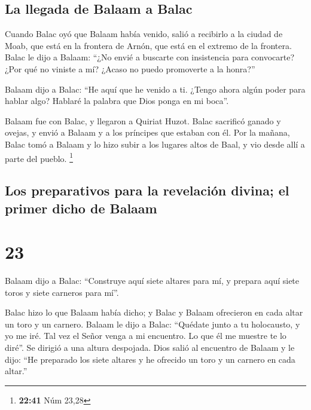 \hypertarget{la-llegada-de-balaam-a-balac}{%
\subsection{La llegada de Balaam a
Balac}\label{la-llegada-de-balaam-a-balac}}

 Cuando Balac oyó que Balaam había venido, salió a
recibirlo a la ciudad de Moab, que está en la frontera de Arnón, que
está en el extremo de la frontera.  Balac le dijo a
Balaam: ``¿No envié a buscarte con insistencia para convocarte? ¿Por qué
no viniste a mí? ¿Acaso no puedo promoverte a la honra?''

 Balaam dijo a Balac: ``He aquí que he venido a ti.
¿Tengo ahora algún poder para hablar algo? Hablaré la palabra que Dios
ponga en mi boca''.

 Balaam fue con Balac, y llegaron a Quiriat Huzot.
 Balac sacrificó ganado y ovejas, y envió a Balaam y a
los príncipes que estaban con él.  Por la mañana, Balac
tomó a Balaam y lo hizo subir a los lugares altos de Baal, y vio desde
allí a parte del pueblo. \footnote{\textbf{22:41} Núm 23,28}

\hypertarget{los-preparativos-para-la-revelaciuxf3n-divina-el-primer-dicho-de-balaam}{%
\subsection{Los preparativos para la revelación divina; el primer dicho
de
Balaam}\label{los-preparativos-para-la-revelaciuxf3n-divina-el-primer-dicho-de-balaam}}

\hypertarget{section-22}{%
\section{23}\label{section-22}}

 Balaam dijo a Balac: ``Construye aquí siete altares para
mí, y prepara aquí siete toros y siete carneros para mí''.

 Balac hizo lo que Balaam había dicho; y Balac y Balaam
ofrecieron en cada altar un toro y un carnero.  Balaam le
dijo a Balac: ``Quédate junto a tu holocausto, y yo me iré. Tal vez el
Señor venga a mi encuentro. Lo que él me muestre te lo diré''. Se
dirigió a una altura despojada.  Dios salió al encuentro
de Balaam y le dijo: ``He preparado los siete altares y he ofrecido un
toro y un carnero en cada altar.''

